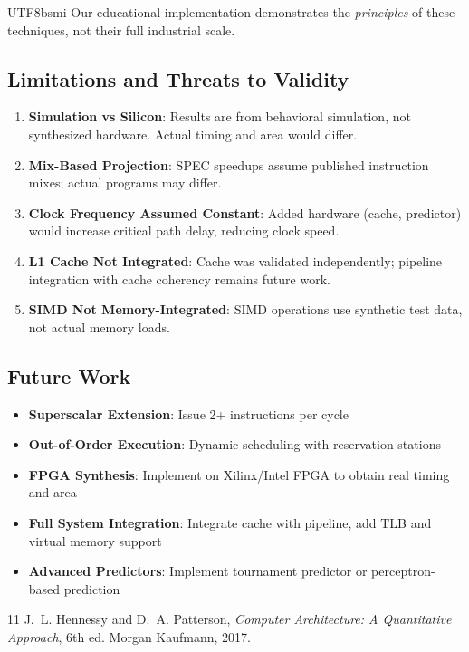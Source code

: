 \documentclass[journal,twoside]{IEEEtran}
\begin{document}
\begin{CJK}{UTF8}{bsmi}
Our educational implementation demonstrates the \textit{principles} of these techniques, not their full industrial scale.

\subsection{Limitations and Threats to Validity}
\begin{enumerate}
\item \textbf{Simulation vs Silicon}: Results are from behavioral simulation, not synthesized hardware. Actual timing and area would differ.
\item \textbf{Mix-Based Projection}: SPEC speedups assume published instruction mixes; actual programs may differ.
\item \textbf{Clock Frequency Assumed Constant}: Added hardware (cache, predictor) would increase critical path delay, reducing clock speed.
\item \textbf{L1 Cache Not Integrated}: Cache was validated independently; pipeline integration with cache coherency remains future work.
\item \textbf{SIMD Not Memory-Integrated}: SIMD operations use synthetic test data, not actual memory loads.
\end{enumerate}

\subsection{Future Work}
\begin{itemize}
    \item \textbf{Superscalar Extension}: Issue 2+ instructions per cycle
    \item \textbf{Out-of-Order Execution}: Dynamic scheduling with reservation stations
    \item \textbf{FPGA Synthesis}: Implement on Xilinx/Intel FPGA to obtain real timing and area
    \item \textbf{Full System Integration}: Integrate cache with pipeline, add TLB and virtual memory support
    \item \textbf{Advanced Predictors}: Implement tournament predictor or perceptron-based prediction
\end{itemize}

\balance

\begin{thebibliography}{11}
 J.~L. Hennessy and D.~A. Patterson, \emph{Computer Architecture: A Quantitative Approach}, 6th ed. Morgan Kaufmann, 2017.


\end{thebibliography}
\end{CJK}
\end{document}
